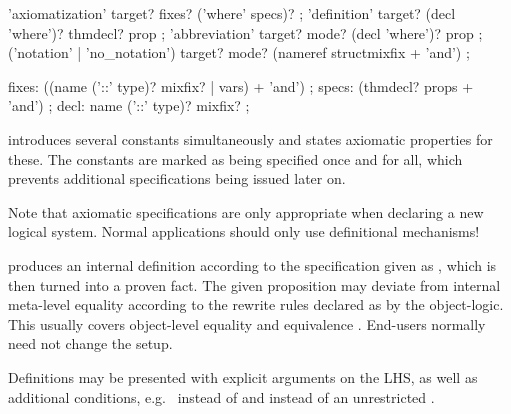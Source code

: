 \begin{isabellebody}
\begin{isamarkuptext}
  \begin{rail}
    'axiomatization' target? fixes? ('where' specs)?
    ;
    'definition' target? (decl 'where')? thmdecl? prop
    ;
    'abbreviation' target? mode? (decl 'where')? prop
    ;
    ('notation' | 'no\_notation') target? mode? (nameref structmixfix + 'and')
    ;

    fixes: ((name ('::' type)? mixfix? | vars) + 'and')
    ;
    specs: (thmdecl? props + 'and')
    ;
    decl: name ('::' type)? mixfix?
    ;
  \end{rail}

  \begin{descr}
  
  \item [\hyperlink{command.axiomatization}{\mbox{\isa{\isacommand{axiomatization}}}}~\isa{{\isachardoublequote}c\isactrlsub {\isadigit{1}}\ {\isasymdots}\ c\isactrlsub m\ {\isasymWHERE}\ {\isasymphi}\isactrlsub {\isadigit{1}}\ {\isasymdots}\ {\isasymphi}\isactrlsub n{\isachardoublequote}}] introduces several constants
  simultaneously and states axiomatic properties for these.  The
  constants are marked as being specified once and for all, which
  prevents additional specifications being issued later on.
  
  Note that axiomatic specifications are only appropriate when
  declaring a new logical system.  Normal applications should only use
  definitional mechanisms!

  \item [\hyperlink{command.definition}{\mbox{\isa{\isacommand{definition}}}}~\isa{{\isachardoublequote}c\ {\isasymWHERE}\ eq{\isachardoublequote}}] produces an
  internal definition  according to the specification
  given as , which is then turned into a proven fact.  The
  given proposition may deviate from internal meta-level equality
  according to the rewrite rules declared as \hyperlink{attribute.defn}{\mbox{}} by the
  object-logic.  This usually covers object-level equality  and equivalence .  End-users normally need not
  change the \hyperlink{attribute.defn}{\mbox{}} setup.
  
  Definitions may be presented with explicit arguments on the LHS, as
  well as additional conditions, e.g.\  instead of
   and  instead of an
  unrestricted .
  

\end{descr}
\end{isamarkuptext}
\end{isabellebody}
